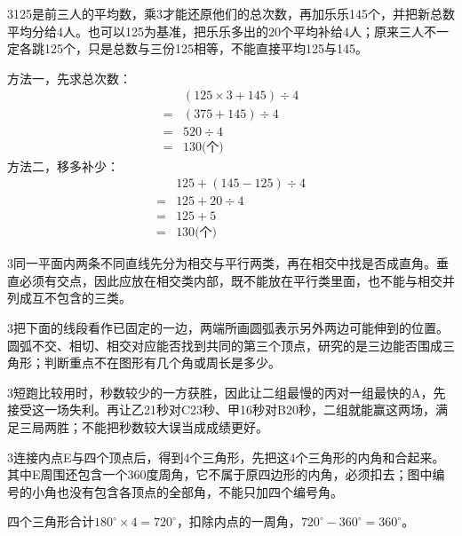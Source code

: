 \documentclass[multi=snippet,border={5bp 20bp 5bp 5bp}]{standalone}
\newenvironment{snippet}[3]{\begin{minipage}{#1bp}\color{answerred}\fontsize{#2}{#3}\selectfont\raggedright}{\end{minipage}}
\begin{document}
\begin{snippet}{505}{11.5}{14}\begin{multicols}{3}\raggedcolumns 125是前三人的平均数，乘3才能还原他们的总次数，再加乐乐145个，并把新总数平均分给4人。也可以125为基准，把乐乐多出的20个平均补给4人；原来三人不一定各跳125个，只是总数与三份125相等，不能直接平均125与145。\par 方法一，先求总次数：\[\begin{aligned}&(125\times3+145)\div4\\={}&(375+145)\div4\\={}&520\div4\\={}&130\text{(个)}\end{aligned}\]方法二，移多补少：\[\begin{aligned}&125+(145-125)\div4\\={}&125+20\div4\\={}&125+5\\={}&130\text{(个)}\end{aligned}\]\end{multicols}\end{snippet}
\begin{snippet}{505}{11.5}{14}\begin{multicols}{3}\raggedcolumns 同一平面内两条不同直线先分为相交与平行两类，再在相交中找是否成直角。垂直必须有交点，因此应放在相交类内部，既不能放在平行类里面，也不能与相交并列成互不包含的三类。\end{multicols}\end{snippet}
\begin{snippet}{505}{11.5}{14}\begin{multicols}{3}\raggedcolumns 把下面的线段看作已固定的一边，两端所画圆弧表示另外两边可能伸到的位置。圆弧不交、相切、相交对应能否找到共同的第三个顶点，研究的是三边能否围成三角形；判断重点不在图形有几个角或周长是多少。\end{multicols}\end{snippet}
\begin{snippet}{505}{11.5}{14}\begin{multicols}{3}\raggedcolumns 短跑比较用时，秒数较少的一方获胜，因此让二组最慢的丙对一组最快的A，先接受这一场失利。再让乙21秒对C23秒、甲16秒对B20秒，二组就能赢这两场，满足三局两胜；不能把秒数较大误当成成绩更好。\end{multicols}\end{snippet}
\begin{snippet}{505}{11.5}{14}\begin{multicols}{3}\raggedcolumns 连接内点E与四个顶点后，得到4个三角形，先把这4个三角形的内角和合起来。其中E周围还包含一个360度周角，它不属于原四边形的内角，必须扣去；图中编号的小角也没有包含各顶点的全部角，不能只加四个编号角。\par 四个三角形合计\(180^\circ\times4=720^\circ\)\allowbreak ，扣除内点的一周角，\(720^\circ-360^\circ=360^\circ\)\allowbreak 。\end{multicols}\end{snippet}
\end{document}

